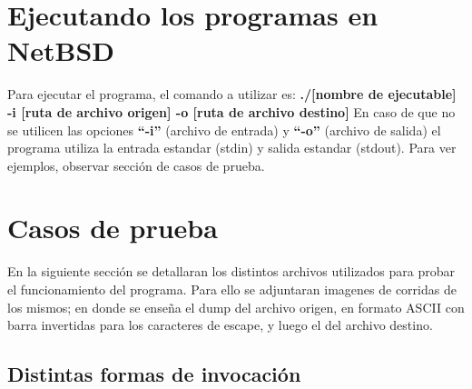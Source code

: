 \documentclass[a4paper,10pt]{article}
\begin{document}
\section{Ejecutando los programas en NetBSD}
  Para ejecutar el programa, el comando a utilizar es:
  \newline
  {\bf./[nombre de ejecutable] -i [ruta de archivo origen] -o [ruta de archivo destino]}
  \newline
  En caso de que no se utilicen las opciones {\bf ``-i''} (archivo de entrada) y {\bf ``-o''} (archivo de salida) el 
  programa utiliza la entrada estandar (stdin) y salida estandar (stdout). Para ver ejemplos, observar 
  secci\'on de casos de prueba.


\section{Casos de prueba}
En la siguiente secci\'on se detallaran los distintos archivos utilizados para probar el funcionamiento del
programa. Para ello se adjuntaran imagenes de corridas de los mismos; en donde se ense\~{n}a el dump del 
archivo origen, en formato ASCII con barra invertidas para los caracteres de escape, y luego el del 
archivo destino.

  \subsection{Distintas formas de invocaci\'on}
\end{document}
